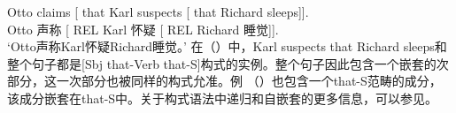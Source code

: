 
\ea
\gll Otto claims [ that Karl suspects [ that Richard sleeps]].\\
	Otto 声称 [ REL Karl 怀疑 [ REL Richard 睡觉]].\\
\glt `Otto声称Karl怀疑Richard睡觉。'
\z
在（）中，Karl suspects that Richard sleeps和整个句子都是[Sbj that-Verb that-S]构式的实例。整个句子因此包含一个嵌套的次部分，这一次部分也被同样的构式允准。例 （）也包含一个that-S范畴的成分，该成分嵌套在that-S中。关于构式语法中递归和自嵌套的更多信息，可以参见。

